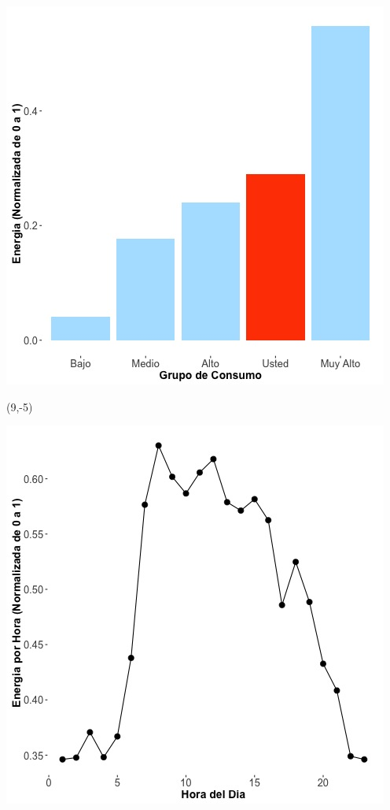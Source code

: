 \documentclass{article}\usepackage[]{graphicx}\usepackage[]{color}
\newenvironment{knitrout}{}{} %
\begin{document}
\begin{knitrout}
\color{fgcolor}
\includegraphics[scale=0.65]{figure/A29_neighbor_plot} 
\end{knitrout}

 \begin{textblock}{1}(9,-5)
\begin{minipage}{20em}
\begingroup

\endgroup
\end{minipage}
\end{textblock}


\begin{knitrout}
\color{fgcolor}
\includegraphics[scale=0.65]{figure/A29_plot_norm_median} 
\end{knitrout}
\end{document}
